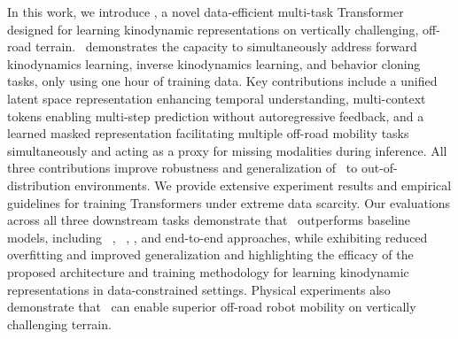 In this work, we introduce \former, a novel data-efficient multi-task Transformer designed for learning kinodynamic representations on vertically challenging, off-road terrain. \former~demonstrates the capacity to simultaneously address forward kinodynamics learning, inverse kinodynamics learning, and behavior cloning tasks, only using one hour of training data. 
Key contributions include a unified latent space representation enhancing temporal understanding, multi-context tokens enabling multi-step prediction without autoregressive feedback, and a learned masked representation facilitating multiple off-road mobility tasks simultaneously and acting as a proxy for missing modalities during inference. All three contributions improve robustness and generalization of \former~to out-of-distribution environments.
We provide extensive experiment results and empirical guidelines for training Transformers under extreme data scarcity. 
Our evaluations across all three downstream tasks demonstrate that \former~outperforms baseline models, including \tal~\cite{datar2024terrainattentive}, \coder~\cite{nazeri2024vertiencoder}, \vertidecoder, and end-to-end approaches, while exhibiting reduced overfitting and improved generalization and highlighting the efficacy of the proposed architecture and training methodology for learning kinodynamic representations in data-constrained settings. Physical experiments also demonstrate that \former~can enable superior off-road robot mobility on vertically challenging terrain.